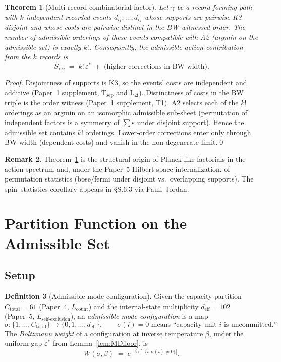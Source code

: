 \documentclass[11pt,a4paper]{article}
\newtheorem{theorem}{Theorem}[section]
\theoremstyle{definition}
\newtheorem{definition}[theorem]{Definition}
\newtheorem{remark}[theorem]{Remark}
\newcommand{\eps}{\varepsilon}
\newcommand{\epsstar}{\varepsilon^{\ast}}
\newcommand{\Ctot}{C_{\mathrm{total}}}
\newcommand{\deff}{d_{\mathrm{eff}}}
\begin{document}
\begin{theorem}[Multi-record combinatorial factor]
\label{thm:kfact}
Let $\gamma$ be a record-forming path with $k$ independent recorded events $d_{i_1},\dots,d_{i_k}$ whose supports are pairwise K3-disjoint and whose costs are pairwise distinct in the BW-witnessed order.  The number of admissible orderings of these events compatible with A2 (argmin on the admissible set) is exactly $k!$.  Consequently, the admissible action contribution from the $k$ records is
\[
   S_{\mathrm{rec}} \;=\; k!\,\epsstar \;+\; \text{(higher corrections in BW-width)}.
\]
\end{theorem}

\begin{proof}
Disjointness of supports is K3, so the events' costs are independent and additive (Paper~1 supplement, T$_{\mathrm{sep}}$ and L$_\Delta$).  Distinctness of costs in the BW triple is the order witness (Paper~1 supplement, T1).  A2 selects each of the $k!$ orderings as an argmin on an isomorphic admissible sub-sheet (permutation of independent factors is a symmetry of $\sum\eps$ under disjoint support).  Hence the admissible set contains $k!$ orderings.  Lower-order corrections enter only through BW-width (dependent costs) and vanish in the non-degenerate limit.\qed
\end{proof}

\begin{remark}
Theorem~\ref{thm:kfact} is the structural origin of Planck-like factorials in the action spectrum and, under the Paper~5 Hilbert-space internalization, of permutation statistics (bose/fermi under disjoint vs.\ overlapping supports).  The spin--statistics corollary appears in §S.6.3 via Pauli--Jordan.
\end{remark}

\section{Partition Function on the Admissible Set}\label{sec:Z0}
\setcounter{theorem}{0}

\subsection{Setup}

\begin{definition}[Admissible mode configuration]
\label{def:config}
Given the capacity partition $\Ctot=61$ (Paper~4, $L_{\mathrm{count}}$) and the internal-state multiplicity $\deff=102$ (Paper~5, $L_{\mathrm{self\text{-}exclusion}}$), an \emph{admissible mode configuration} is a map
\[
  \sigma:\{1,\dots,\Ctot\}\to \{0,1,\dots,\deff\},\qquad \sigma(i)=0 \text{ means ``capacity unit } i \text{ is uncommitted.''}
\]
The \emph{Boltzmann weight} of a configuration at inverse temperature $\beta$, under the uniform gap $\epsstar$ from Lemma~\ref{lem:MDfloor}, is
\[
  W(\sigma,\beta) \;=\; e^{-\beta\,\epsstar\,|\{i:\sigma(i)\neq 0\}|}.
\]
\end{definition}
\end{document}
